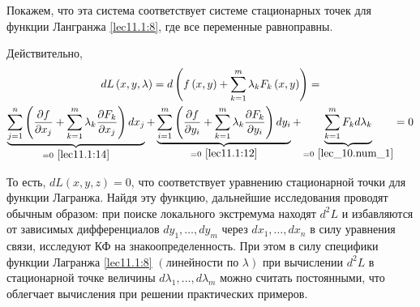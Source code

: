 \documentclass[../../main.tex]{subfiles}
\begin{document}
	Покажем, что эта система соответствует системе стационарных точек для
	функции Лангранжа \eqref{lec11.1:8}, где все переменные равноправны.
	
	Действительно, 
	\begin{multline}
	\label{lec11.1:15}
	dL\left( x, y, \lambda \right) = d\left( f\left( x, y\right) 
	+ \sum\limits_{k=1}^{m}\lambda_k F_k\left( x, y \right) \right) =
	\\
	\underbrace{\sum\limits_{j=1}^{n}\left( 
	\dfrac{\partial f}{\partial x_j} 
	+ \sum\limits_{k=1}^{m}\lambda_k \dfrac{\partial F_k}
	{\partial x_j}  
	\right)d x_j}_{= 0\ \eqref{lec11.1:14}} + 
	\underbrace{\sum\limits_{i=1}^{m} \left( 
	\dfrac{\partial f}{\partial y_i} 
	+ \sum\limits_{k=1}^{m}\lambda_k \dfrac{\partial F_k}
	{\partial y_i}  \right) dy_i}_{= 0\ 
	\eqref{lec11.1:12}}
	+ \underbrace{\sum\limits_{k=1}^{m} F_k d \lambda_k}
	_{= 0\ \eqref{lec_10.num_1}} = 0
	\end{multline}
	
	То есть, $dL\left( x, y, z \right) = 0$, что соответствует уравнению 
	стационарной точки для функции Лагранжа. Найдя эту функцию, дальнейшие
	исследования проводят обычным образом: при поиске локального экстремума 
	находят $d^2L$ и избавляются от зависимых 
	дифференциалов $d y_1, \ldots, d y_m $ 
	через $d x_1, \ldots, d x_n$ в силу уравнения связи, исследуют КФ на 
	знакоопределенность. При этом в силу специфики функции 
	Лагранжа \eqref{lec11.1:8} 
	$\left( \text{линейности по } \lambda \right) $ при вычислении $d^2 L$
	в стационарной точке величины $d \lambda_1, \ldots, d \lambda_m$ можно
	считать постоянными, что облегчает вычисления при решении практических
	примеров.
	
\end{document}
